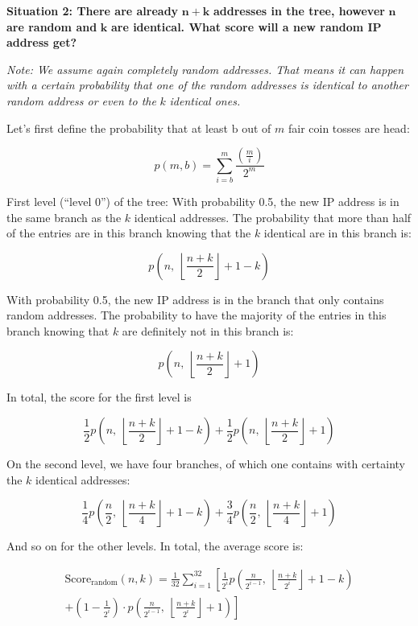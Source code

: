\textbf{Situation 2: There are already} \(\mathbf{n + k}\)
\textbf{addresses in the tree, however} \(\mathbf{n}\) \textbf{are
random and} \(\mathbf{k}\) \textbf{are identical. What score will a new
random IP address get?}

\emph{Note: We assume again completely random addresses. That means it can
happen with a certain probability that one of the random addresses is
identical to another random address or even to the} \(k\)
\emph{identical ones.}

Let's first define the probability that at least \(\text{b\ }\)out of
\(m\) fair coin tosses are head:

\[p(m,b) = \sum_{i = b}^{m}\frac{\left( \frac{m}{i} \right)}{2^{m}}\]


First level (``level 0'') of the tree: With probability 0.5, the new IP address is
in the same branch as the \(k\) identical addresses. The probability
that more than half of the entries are in this branch knowing that
the $k$ identical are in this branch is:

\[p\left( n,\ \left\lfloor \frac{n + k}{2} \right\rfloor + 1 - k \right)\]

With probability 0.5, the new IP address is in the branch that only
contains random addresses. The probability to have the majority of the
entries in this branch knowing that \(k\) are definitely not in this
branch is:

\[p\left( n,\ \left\lfloor \frac{n + k}{2} \right\rfloor + 1 \right)\]

In total, the score for the first level is

\[\frac{1}{2}p\left( n,\ \left\lfloor \frac{n + k}{2} \right\rfloor + 1 - k \right) + \frac{1}{2}p\left( n,\ \left\lfloor \frac{n + k}{2} \right\rfloor + 1 \right)\]

On the second level, we have four branches, of which one contains with
certainty the \(k\) identical addresses:

\[\frac{1}{4}p\left( \frac{n}{2},\ \left\lfloor \frac{n + k}{4} \right\rfloor + 1 - k \right) + \frac{3}{4}p\left( \frac{n}{2},\ \left\lfloor \frac{n + k}{4} \right\rfloor + 1 \right)\]

And so on for the other levels. In total, the average score is:

\[
\begin{split}
\text{Score}_{\text{random}}(n,k) = \frac{1}{32} \sum_{i = 1}^{32}\left\lbrack \frac{1}{2^{i}}p\left( \frac{n}{2^{i - 1}},\ \left\lfloor \frac{n + k}{2^{i}} \right\rfloor + 1 - k \right)\right. \\
+ \left.\left( 1 - \frac{1}{2^{i}} \right) \cdot p\left( \frac{n}{2^{i - 1}},\ \left\lfloor \frac{n + k}{2^{i}} \right\rfloor + 1 \right) \right\rbrack
\end{split}
\]



